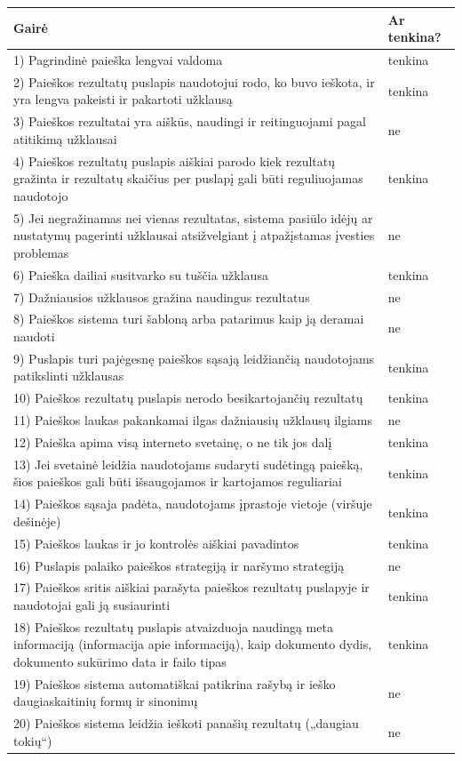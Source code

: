 \documentclass{VUMIFPSkursinis}
\begin{document}
\begin{center}
\begin{tabular}{ |p{}|p{2cm}| } 
 \hline
	Gairė & Ar tenkina? \\ \hline
	1) Pagrindinė paieška lengvai valdoma & tenkina \\ \hline
	2) Paieškos rezultatų puslapis naudotojui rodo, ko buvo ieškota, ir yra lengva pakeisti ir pakartoti užklausą & tenkina \\ \hline
	3) Paieškos rezultatai yra aiškūs, naudingi ir reitinguojami pagal atitikimą užklausai & ne \\ \hline
	4) Paieškos rezultatų puslapis aiškiai parodo kiek rezultatų gražinta ir rezultatų skaičius per puslapį gali būti reguliuojamas naudotojo & tenkina \\ \hline
	5) Jei negražinamas nei vienas rezultatas, sistema pasiūlo idėjų ar nustatymų pagerinti užklausai atsižvelgiant į atpažįstamas įvesties problemas & ne \\ \hline
	6) Paieška dailiai susitvarko su tuščia užklausa & tenkina \\ \hline
	7) Dažniausios užklausos gražina naudingus rezultatus & ne \\ \hline
	8) Paieškos sistema turi šabloną arba patarimus kaip ją deramai naudoti & ne \\ \hline
	9) Puslapis turi pajėgesnę paieškos sąsają leidžiančią naudotojams patikslinti užklausas & tenkina \\ \hline
	10) Paieškos rezultatų puslapis nerodo besikartojančių rezultatų & tenkina \\ \hline
	11) Paieškos laukas pakankamai ilgas dažniausių užklausų ilgiams & ne \\ \hline
	12) Paieška apima visą interneto svetainę, o ne tik jos dalį & tenkina \\ \hline
	13) Jei svetainė leidžia naudotojams sudaryti sudėtingą paiešką, šios paieškos gali būti išsaugojamos ir kartojamos reguliariai & tenkina \\ \hline
	14) Paieškos sąsaja padėta, naudotojams įprastoje vietoje (viršuje dešinėje) & tenkina \\ \hline
	15) Paieškos laukas ir jo kontrolės aiškiai pavadintos & tenkina \\ \hline
	16) Puslapis palaiko paieškos strategiją ir naršymo strategiją & ne \\ \hline
	17) Paieškos sritis aiškiai parašyta paieškos rezultatų puslapyje ir naudotojai gali ją susiaurinti & tenkina \\ \hline
	18) Paieškos rezultatų puslapis atvaizduoja naudingą meta informaciją (informacija apie informaciją), kaip dokumento dydis, dokumento sukūrimo data ir failo tipas & tenkina \\ \hline
	19) Paieškos sistema automatiškai patikrina rašybą ir ieško daugiaskaitinių formų ir sinonimų & ne \\ \hline
	20) Paieškos sistema leidžia ieškoti panašių rezultatų („daugiau tokių“) & ne \\ \hline
\end{tabular}
\label{PaieškosLentelėPrad}
\end{center}
\pagebreak
\end{document}
